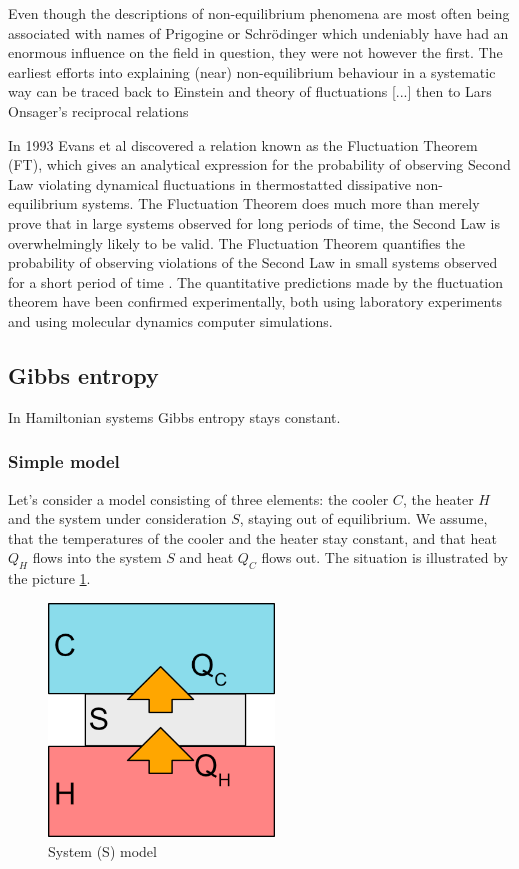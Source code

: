 \documentclass[a4paper,12pt,nofootinbib]{article}
\begin{document}
Even though the descriptions of non-equilibrium phenomena are most often being associated with names of Prigogine or Schr{\" o}dinger which undeniably have had an enormous influence on the field in question, they were not however the first.
The earliest efforts into explaining (near) non-equilibrium behaviour in a systematic way can be traced back to Einstein and theory of fluctuations [...] then to Lars Onsager's reciprocal relations


In 1993 Evans et al discovered a relation known as the Fluctuation Theorem (FT), which gives an analytical expression for the probability of observing Second Law violating dynamical fluctuations in thermostatted dissipative non-equilibrium systems.
The Fluctuation Theorem does much more than merely prove that in large systems observed for long periods of time, the Second Law is overwhelmingly likely to be valid. The Fluctuation Theorem quantifies the probability of observing violations of the Second Law in small systems observed for a short period of time \cite{Evans:2002gy}. The quantitative predictions made by the fluctuation theorem have been confirmed experimentally, both using laboratory experiments and using molecular dynamics computer simulations.

\subsection{Gibbs entropy}

In Hamiltonian systems Gibbs entropy stays constant.


\subsubsection{Simple model}
Let's consider a model consisting of three elements: the cooler $C$, the heater $H$ and the system under consideration $S$, staying out of equilibrium.
We assume, that the temperatures of the cooler and the heater stay constant, and that heat $Q_H$ flows into the system $S$ and heat $Q_C$ flows out. The situation is illustrated by the picture \ref{Fig2}.
\begin{figure}[ht!]
\centering \includegraphics[width=6cm]{system} \caption{System (S) model}
\label{Fig2} 
\end{figure}
\end{document}
